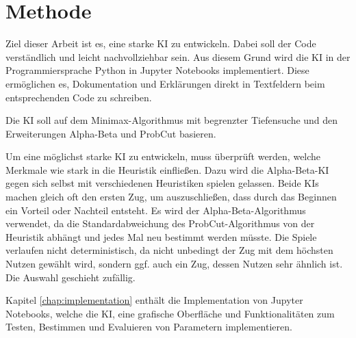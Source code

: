 
\chapter{Methode}
\label{chap:methode}

Ziel dieser Arbeit ist es, eine starke KI zu entwickeln. Dabei soll der Code verständlich und leicht nachvollziehbar
sein. Aus diesem Grund wird die KI in der Programmiersprache Python in Jupyter Notebooks implementiert. Diese
ermöglichen es, Dokumentation und Erklärungen direkt in Textfeldern beim entsprechenden Code zu schreiben.

Die KI soll auf dem Minimax-Algorithmus mit begrenzter Tiefensuche und den Erweiterungen Alpha-Beta und ProbCut
basieren.

Um eine möglichst starke KI zu entwickeln, muss überprüft werden, welche Merkmale wie stark in die Heuristik einfließen.
Dazu wird die Alpha-Beta-KI gegen sich selbst mit verschiedenen Heuristiken spielen gelassen. Beide KIs machen gleich
oft den ersten Zug, um auszuschließen, dass durch das Beginnen ein Vorteil oder Nachteil entsteht. Es wird der
Alpha-Beta-Algorithmus verwendet, da die Standardabweichung des ProbCut-Algorithmus von der Heuristik abhängt und jedes
Mal neu bestimmt werden müsste. Die Spiele verlaufen nicht deterministisch, da nicht unbedingt der Zug mit dem höchsten
Nutzen gewählt wird, sondern ggf. auch ein Zug, dessen Nutzen sehr ähnlich ist. Die Auswahl geschieht zufällig.

Kapitel \ref{chap:implementation} enthält die Implementation von Jupyter Notebooks, welche die KI, eine grafische
Oberfläche und Funktionalitäten zum Testen, Bestimmen und Evaluieren von Parametern implementieren.
